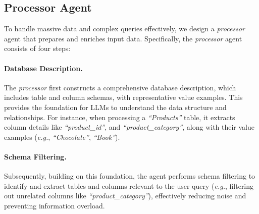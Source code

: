 

\subsection{Processor Agent} 
\label{processor}

To handle massive data and complex queries effectively, we design a \textit{processor} agent that prepares and enriches input data. 
Specifically, the \textit{processor} agent consists of four steps:

\paragraph{Database Description.}
The \textit{processor} first constructs a comprehensive database description, which includes table and column schemas, with representative value examples. This provides the foundation for LLMs to understand the data structure and relationships. 
For instance, when processing a \textit{``Products''} table, it extracts column details like \textit{``product\_id''}, and \textit{``product\_category''}, along with their value examples (\emph{e.g.}, \textit{``Chocolate''}, \textit{``Book''}).

\paragraph{Schema Filtering.}
Subsequently, building on this foundation, the agent performs schema filtering to identify and extract tables and columns relevant to the user query (\emph{e.g.}, filtering out unrelated columns like \textit{``product\_category''}), effectively reducing noise and preventing information overload.


